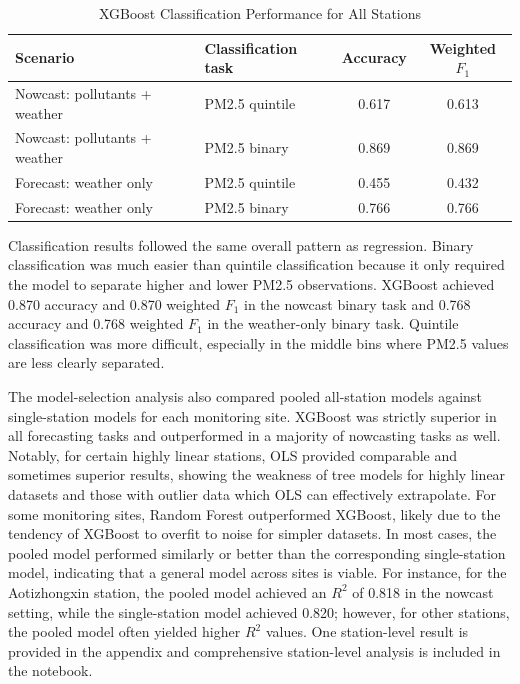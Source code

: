 \documentclass[stu,12pt,floatsintext]{apa7}
\begin{document}
\begin{table}[H]
  \begin{threeparttable}
  \caption{XGBoost Classification Performance for All Stations}
  \label{tab:class}
  \begin{tabular}{llcc}
    \toprule
    \textbf{Scenario} & \textbf{Classification task} & \textbf{Accuracy}
                      & \textbf{Weighted $F_1$} \\
    \midrule
    Nowcast: pollutants + weather & PM2.5 quintile & 0.617 & 0.613 \\
    Nowcast: pollutants + weather & PM2.5 binary   & 0.869 & 0.869 \\
    Forecast: weather only        & PM2.5 quintile & 0.455 & 0.432 \\
    Forecast: weather only        & PM2.5 binary   & 0.766 & 0.766 \\
    \bottomrule
  \end{tabular}
  \end{threeparttable}
\end{table}

Classification results followed the same overall pattern as regression. Binary
classification was much easier than quintile classification because it only required the
model to separate higher and lower PM2.5 observations. XGBoost achieved 0.870 accuracy
and 0.870 weighted $F_1$ in the nowcast binary task and 0.768 accuracy and 0.768 weighted
$F_1$ in the weather-only binary task. Quintile classification was more difficult,
especially in the middle bins where PM2.5 values are less clearly separated.

The model-selection analysis also compared pooled all-station models against single-station
models for each monitoring site. XGBoost was strictly superior in all forecasting tasks and 
outperformed in a majority of nowcasting tasks as well. Notably, for certain highly linear stations, OLS provided
comparable and sometimes superior results, showing the weakness of tree models for highly linear
datasets and those with outlier data which OLS can effectively extrapolate. 
For some monitoring sites, Random Forest outperformed XGBoost, likely due to the tendency
of XGBoost to overfit to noise for simpler datasets.
In most cases, the pooled model performed similarly or better than the corresponding single-station model,
indicating that a general model across sites is viable. For instance, for the Aotizhongxin station, 
the pooled model achieved an $R^{2}$ of 0.818 in the nowcast setting, while the single-station model achieved 0.820; however,
for other stations, the pooled model often yielded higher $R^{2}$ values. 
One station-level result is provided in the appendix and comprehensive station-level analysis is included in the notebook.
\end{document}
